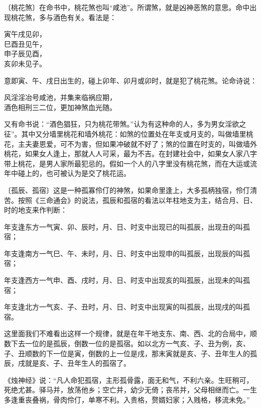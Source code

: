 \documentclass[a5paper,oneside,12pt]{ctexbook}
\newcommand*{\circled}[1]{\ifthenelse{#1 > 10}{\lower.7ex\hbox{\tikz\draw (0pt, 0pt) circle (.5em) node {\makebox[1em][c]{\footnotesize #1}};}}{\lower.7ex\hbox{\tikz\draw (0pt, 0pt) circle (.5em) node {\makebox[1em][c]{\small #1}};}}}
\newenvironment{tightcenter}{%
  \setlength\topsep{0pt}
  \setlength\parskip{0pt}
  \begin{center}\kaishu 
}{%
  \end{center}
}
\begin{document}
〔桃花煞〕在命书中，桃花煞也叫“咸池”。所谓煞，就是凶神恶煞的意思。命中出现桃花煞，多与酒色有关。看法是：
\begin{tightcenter}
寅午戌见卯，\\
巳酉丑见午，\\
申子辰见酉，\\
亥卯未见子。\\    
\end{tightcenter}
意即寅、午、戌日出生的，碰上卯年、卯月或卯时，就是犯了桃花煞。论命诗说：
\begin{tightcenter}
    风淫淫冶号咸池，并集来临祸应期，\\
    酒色相刑三二位，更加神煞血光随。\\
\end{tightcenter}

又有命书说：“酒色猖狂，只为桃花带煞。”认为有这种命的人，多为男女淫欲之征”。其中又分墙里桃花和墙外桃花：如煞的位置处在年支或月支的，叫做墙里桃花，主夫妻恩爱，可不为害，但如果冲破就不好了；煞的位置在时支的，叫做墙外桃花，如果女人逢上，那就人人可采，最为不吉。在封建社会中，如果女人家八字带上桃花，是男人家所最犯忌的。假如一个人的八字里没有桃花煞，而在大运或流年中碰上的，也可被认为是交了桃花运。

〔孤辰、孤宿〕这是一种孤寡伶仃的神煞，如果命里逢上，大多孤柄独宿，伶仃清苦。按照《三命通会》的说法，孤辰和孤宿的看法以年柱地支为主，结合月、日、时的地支来作判断：
\begin{enumerate}[label=\circled{\arabic*},topsep=0pt,parsep=0pt,itemsep=0pt,leftmargin=3.5em,labelsep=0em]
\item 年支逢东方一气寅、卯、辰时，月、日、时支中出现已的叫孤辰，出现丑的叫孤宿；
\item 年支逢南方一气巳、午、未时，月、日、时支中出现申的叫孤辰，出现辰的叫孤宿；
\item 年支逢西方一气申、酉、戌时，月、日、时支中出现亥的叫孤辰，出现未的叫孤宿；
\item 年支逢北方一气亥、子、丑时，月、日、时支中出现寅的叫孤辰，出现戌的叫孤宿。
\end{enumerate}

这里面我们不难看出这样一个规律，就是在年干地支东、南、西、北的合局中，顺数下去一位的是孤辰，倒数一位的是孤宿。如以北方一气亥、子、丑为例，亥、子、丑顺数的下一位是寅，倒数的上一位是戌，那末寅就是亥、子、丑年生人的孤辰，戌就是亥、子、丑年生人的孤宿了。

《烛神经》说：“凡人命犯孤宿，主形孤骨露，面无和气，不利六亲。生旺稍可，死绝尤甚。驿马并，放荡他乡；空亡并，幼少无倚；丧吊并，父母相继而亡。一生多逢重丧叠祸，骨肉伶仃，单寒不利。入贵格，赘婿妇家；入贱格，移流未免。”
\end{document}

